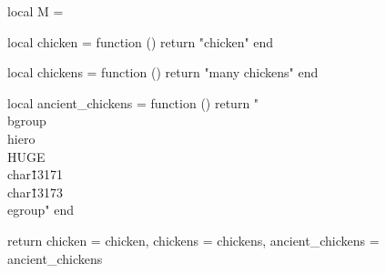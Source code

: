 local M = {}

local chicken = function ()
  return "chicken"
end

local chickens = function ()
  return "many chickens"
end

local ancient_chickens = function ()
  return "\\bgroup\\hiero\\HUGE\\char\"13171 \\char\"13173\\egroup"
end

return {chicken                = chicken,
            chickens              = chickens,
            ancient_chickens  = ancient_chickens}
